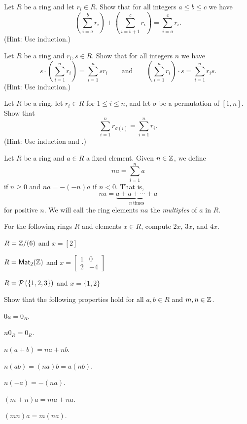 \begin{exercise} \label{exerc:big-sigma-break}
Let \(R\) be a ring and let \(r_i \in R\).
Show that for all integers \(a \leq b \leq c\) we have \[ \left( \sum_{i=a}^b r_i \right) + \left( \sum_{i=b+1}^c r_i \right) = \sum_{i=a}^c r_i. \]
(Hint: Use induction.)
\end{exercise}

\begin{exercise}
Let \(R\) be a ring and \(r_i, s \in R\).
Show that for all integers \(n\) we have \[ s \cdot \left( \sum_{i=1}^n r_i \right) = \sum_{i=1}^n sr_i \quad\quad \mathrm{and} \quad\quad \left( \sum_{i=1}^n r_i \right) \cdot s = \sum_{i=1}^n r_i s. \]
(Hint: Use induction.)
\end{exercise}

\begin{exercise}
Let \(R\) be a ring, let \(r_i \in R\) for \(1 \leq i \leq n\), and let \(\sigma\) be a permutation of \([1,n]\).
Show that \[ \sum_{i=1}^n r_{\sigma(i)} = \sum_{i=1}^n r_i. \]
(Hint: Use induction and .)
\end{exercise}

\begin{dfn} \label{dfn:mult-elt}
Let \(R\) be a ring and \(a \in R\) a fixed element.
Given \(n \in \mathbb{Z}\), we define \[ na = \sum_{i=1}^n a \] if \(n \geq 0\) and \(na = -(-n)a\) if \(n < 0\).
That is, \[ na = \underbrace{a + a + \cdots + a}_{n\ \mathrm{times}} \] for positive \(n\).
We will call the ring elements \(na\) the \emph{multiples} of \(a\) in \(R\).
\end{dfn}

\begin{exercise}
For the following rings \(R\) and elements \(x \in R\), compute \(2x\), \(3x\), and \(4x\).
\begin{proplist}
\item \(R = \mathbb{Z}/(6)\) and \(x = [2]\)
\item \(R = \mathsf{Mat}_{2}(\mathbb{Z})\) and \(x = \begin{bmatrix} 1 & 0 \\ 2 & -4 \end{bmatrix}\)
\item \(R = \mathcal{P}\left(\{ 1,2,3 \}\right)\) and \(x = \{ 1,2 \}\)
\end{proplist}
\end{exercise}

\begin{exercise} \label{exerc:elt-mult}
Show that the following properties hold for all \(a,b \in R\) and \(m,n \in \mathbb{Z}\).
\begin{proplist*}
\item \(0a = 0_R\).
\item \(n 0_R = 0_R\).
\item \(n(a+b) = na + nb\).
\item \(n(ab) = (na)b = a(nb)\).
\item \(n(-a) = -(na)\).
\item \((m+n)a = ma + na\).
\item \((mn)a = m(na)\).
\end{proplist*}
\end{exercise}

